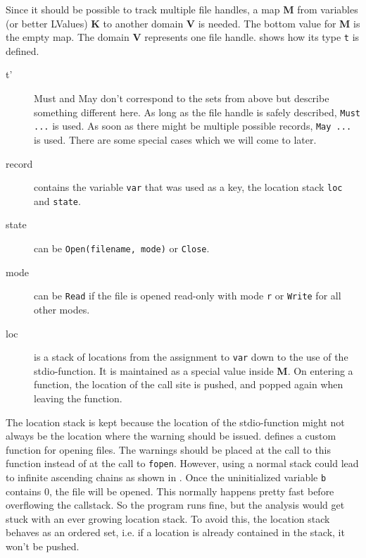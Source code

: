 Since it should be possible to track multiple file handles, a map \textbf{M} from variables (or better LValues) \textbf{K} to another domain \textbf{V} is needed. The bottom value for \textbf{M} is the empty map.
The domain \textbf{V} represents one file handle.  shows how its type \verb|t| is defined.
\begin{description}
\item[t'] Must and May don't correspond to the sets from above but describe something different here. As long as the file handle is safely described, \verb|Must ...| is used. As soon as there might be multiple possible records, \verb|May ...| is used. There are some special cases which we will come to later.

\item[record] contains the variable \verb|var| that was used as a key, the location stack \verb|loc| and \verb|state|.

\item[state] can be \verb|Open(filename, mode)| or \verb|Close|.

\item[mode] can be \verb|Read| if the file is opened read-only with mode \verb|r| or \verb|Write| for all other modes.

\item[loc] is a stack of locations from the assignment to \verb|var| down to the use of the stdio-function. It is maintained as a special value inside \textbf{M}. On entering a function, the location of the call site is pushed, and popped again when leaving the function.
\end{description}
The location stack is kept because the location of the stdio-function might not always be the location where the warning should be issued.  defines a custom function for opening files. The warnings should be placed at the call to this function instead of at the call to \verb|fopen|.
However, using a normal stack could lead to infinite ascending chains as shown in . Once the uninitialized variable \verb|b| contains 0, the file will be opened. This normally happens pretty fast before overflowing the callstack. So the program runs fine, but the analysis would get stuck with an ever growing location stack. To avoid this, the location stack behaves as an ordered set, i.e. if a location is already contained in the stack, it won't be pushed. %
